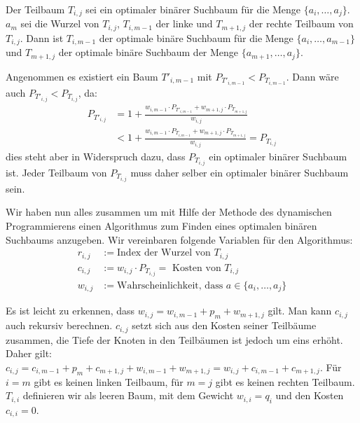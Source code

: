 \begin{Lma}
  \hspace{\parindent}Der Teilbaum $T_{i,j}$ sei ein optimaler binärer Suchbaum für die Menge $\{a_i, \ldots, a_j\}$. $a_m$ sei die Wurzel von $T_{i,j}$, $T_{i,m-1}$ der linke und $T_{m+1,j}$ der rechte Teilbaum von $T_{i,j}$. Dann ist $T_{i,m-1}$ der optimale binäre Suchbaum für die Menge $\{a_i, \ldots, a_{m-1}\}$ und $T_{m+1,j}$ der optimale binäre Suchbaum der Menge $\{a_{m+1}, \ldots, a_j\}$.
\end{Lma}

\begin{Bew}
  \hspace{\parindent}Angenommen es existiert ein Baum $T'_{i,m-1}$ mit $P_{T'_{i,m-1}} < P_{T_{i,m-1}}$. Dann wäre auch $P_{T'_{i,j}} < P_{T_{i,j}}$, da:
  \begin{align*}
    P_{T'_{i,j}} &= 1 + \frac{w_{i,m-1} \cdot P_{T'_{i,m-1}} + w_{m+1, j} \cdot P_{T_{m+1,j}}}{w_{i,j}}\\
      &< 1 + \frac{w_{i,m-1} \cdot P_{T_{i,m-1}} + w_{m+1, j} \cdot P_{T_{m+1,j}}}{w_{i,j}} = P_{T_{i,j}}
  \end{align*}
  dies steht aber in Widerspruch dazu, dass $P_{T_{i,j}}$ ein optimaler binärer Suchbaum ist. Jeder Teilbaum von $P_{T_{i,j}}$ muss daher selber ein optimaler binärer Suchbaum sein.
\end{Bew}

Wir haben nun alles zusammen um mit Hilfe der Methode des dynamischen Programmierens einen Algorithmus zum Finden eines optimalen binären Suchbaums anzugeben.
Wir vereinbaren folgende Variablen für den Algorithmus:
\begin{align*}
  r_{i,j} &:= \text{Index der Wurzel von } T_{i,j}\\
  c_{i,j} &:= w_{i,j} \cdot P_{T_{i,j}} = \text{ Kosten von } T_{i,j}\\
  w_{i,j} &:= \text{Wahrscheinlichkeit, dass } a \in \{a_i, \ldots, a_j\}
\end{align*}

Es ist leicht zu erkennen, dass $w_{i,j} = w_{i, m-1} + p_m + w_{m+1, j}$ gilt. Man kann $c_{i,j}$ auch rekursiv berechnen. $c_{i,j}$ setzt sich aus den Kosten seiner Teilbäume zusammen, die Tiefe der Knoten in den Teilbäumen ist jedoch um eins erhöht. Daher gilt: $c_{i,j} = c_{i,m-1} + p_m + c_{m+1,j} + w_{i,m-1} + w_{m+1,j} = w_{i,j} + c_{i,m-1} + c_{m+1, j}$. Für $i=m$ gibt es keinen linken Teilbaum, für $m=j$ gibt es keinen rechten Teilbaum. $T_{i,i}$ definieren wir als leeren Baum, mit dem Gewicht $w_{i,i} = q_i$ und den Kosten $c_{i,i}=0$.

